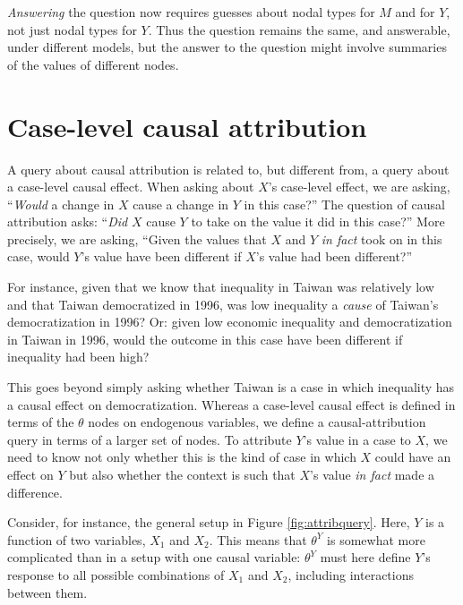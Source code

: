 \documentclass[
  12pt,
]{book}
\begin{document}
\emph{Answering} the question now requires guesses about nodal types for \(M\) and for \(Y\), not just nodal types for \(Y\). Thus the question remains the same, and answerable, under different models, but the answer to the question might involve summaries of the values of different nodes.

\hypertarget{case-level-causal-attribution}{%
\section{Case-level causal attribution}\label{case-level-causal-attribution}}

A query about causal attribution is related to, but different from, a query about a case-level causal effect. When asking about \(X\)'s case-level effect, we are asking, ``\emph{Would} a change in \(X\) cause a change in \(Y\) in this case?'' The question of causal attribution asks: ``\emph{Did} \(X\) cause \(Y\) to take on the value it did in this case?'' More precisely, we are asking, ``Given the values that \(X\) and \(Y\) \emph{in fact} took on in this case, would \(Y\)'s value have been different if \(X\)'s value had been different?''

For instance, given that we know that inequality in Taiwan was relatively low and that Taiwan democratized in 1996, was low inequality a \emph{cause} of Taiwan's democratization in 1996? Or: given low economic inequality and democratization in Taiwan in 1996, would the outcome in this case have been different if inequality had been high?

This goes beyond simply asking whether Taiwan is a case in which inequality has a causal effect on democratization. Whereas a case-level causal effect is defined in terms of the \(\theta\) nodes on endogenous variables, we define a causal-attribution query in terms of a larger set of nodes. To attribute \(Y\)'s value in a case to \(X\), we need to know not only whether this is the kind of case in which \(X\) could have an effect on \(Y\) but also whether the context is such that \(X\)'s value \emph{in fact} made a difference.

Consider, for instance, the general setup in Figure \ref{fig:attribquery}. Here, \(Y\) is a function of two variables, \(X_1\) and \(X_2\). This means that \(\theta^Y\) is somewhat more complicated than in a setup with one causal variable: \(\theta^Y\) must here define \(Y\)'s response to all possible combinations of \(X_1\) and \(X_2\), including interactions between them.
\end{document}
